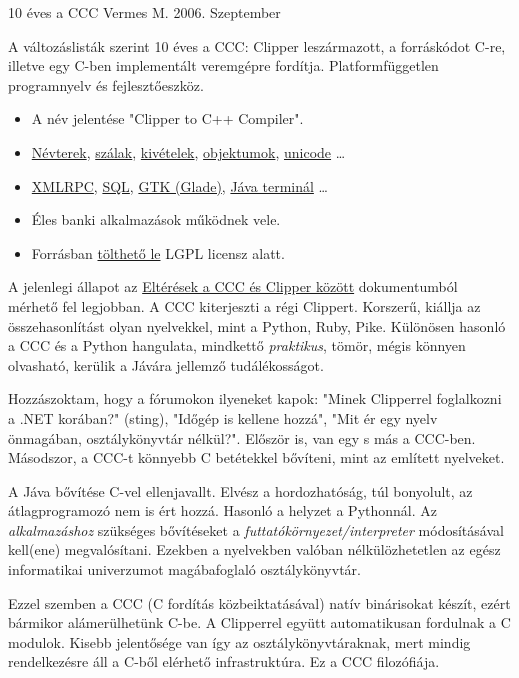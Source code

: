 
\pagetitle%
{10 éves a CCC}%
{Vermes M.}%
{2006. Szeptember}

\medskip

A változáslisták  szerint 10 éves a CCC:
Clipper leszármazott, a forráskódot C-re, 
illetve egy  C-ben implementált veremgépre fordítja.
Platformfüggetlen programnyelv és fejlesztőeszköz.

\begin{itemize}
\item   
    A név jelentése {"}Clipper to C++ Compiler".
\item 
    \href{http://ccc.comfirm.hu/ccc3/ccc-clipper-elteresek.html#NAMESPACE}{Névterek}, 
    \href{http://ccc.comfirm.hu/ccc3/ccc-clipper-elteresek.html#THREADS}{szálak}, 
    \href{http://ccc.comfirm.hu/ccc3/exception.html}{kivételek},
    \href{http://ccc.comfirm.hu/ccc3/objektum.html}{objektumok},
    \href{http://ccc.comfirm.hu/ccc3/ccc3_ujdonsagok.html}{unicode}
    \ldots
\item 
    \href{http://ccc.comfirm.hu/ccc3/xmlrpc-framework.html}{XMLRPC}, 
    \href{http://ccc.comfirm.hu/ccc3/sql2.html}{SQL}, 
    \href{http://ccc.comfirm.hu/ccc3/cccgtk.html}{GTK (Glade)},
    \href{http://ccc.comfirm.hu/ccc3/jterminal.html}{Jáva terminál} \ldots
\item
    Éles banki alkalmazások működnek vele.
\item   
    Forrásban
    \href{git://comfirm.hu/ccc3.git}{tölthető le} 
    LGPL licensz alatt.
\end{itemize}

A jelenlegi állapot  az
\href{http://ccc.comfirm.hu/ccc3/ccc-clipper-elteresek.html}%
{Eltérések a CCC és Clipper között} dokumentumból mérhető fel legjobban.
A CCC kiterjeszti a régi Clippert.
Korszerű, kiállja az összehasonlítást olyan nyelvekkel, 
mint a Python, Ruby, Pike.
Különösen hasonló a CCC és a Python hangulata,
mindkettő  {\em praktikus}, tömör, mégis 
könnyen olvasható, kerülik a Jávára jellemző tudálékosságot.

Hozzászoktam, hogy  a fórumokon ilyeneket kapok: 
{"}Minek Clipperrel foglalkozni a .NET korában?" (sting),  
{"}Időgép is kellene hozzá",
{"}Mit ér egy nyelv önmagában, osztálykönyvtár nélkül?".
Először is, van egy s más a CCC-ben.  Másodszor, a CCC-t
könnyebb C betétekkel bővíteni, mint az említett nyelveket. 

A Jáva bővítése C-vel ellenjavallt. 
Elvész a hordozhatóság, túl bonyolult,  
az átlagprogramozó nem is ért hozzá.
Hasonló a helyzet a Pythonnál.
Az {\em alkalmazáshoz} szükséges bővítéseket a 
{\em futtatókörnyezet/interpreter} módosításával kell(ene)  
megvalósítani. Ezekben a nyelvekben valóban nélkülözhetetlen 
az egész informatikai univerzumot magábafoglaló osztálykönyvtár. 

Ezzel szemben a CCC (C fordítás közbeiktatásával) natív  
binárisokat készít, ezért bármikor alámerülhetünk C-be.
A Clipperrel együtt automatikusan fordulnak a C modulok. 
Kisebb jelentősége van így  az osztálykönyvtáraknak, 
mert mindig rendelkezésre áll a C-ből elérhető infrastruktúra. 
Ez a CCC filozófiája.


